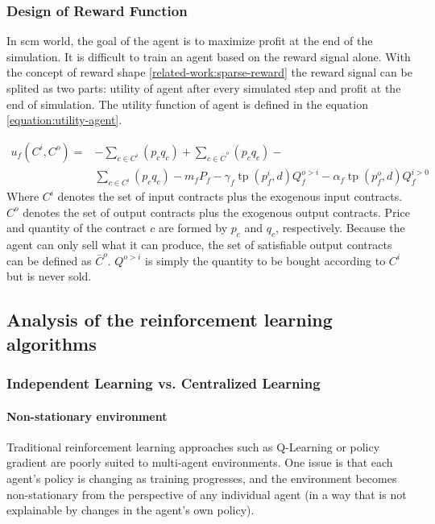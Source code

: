 \subsubsection{Design of Reward Function} 
In \gls{scm} world, the goal of the agent is to maximize profit at the end of the simulation. It is difficult to train an agent based on the reward signal alone. With the concept of reward shape \ref{related-work:sparse-reward} the reward signal can be splited as two parts: utility of agent after every simulated step and profit at the end of simulation. The utility function of agent is defined in the equation \ref{equation:utility-agent}.

\begin{equation} \label{equation:utility-agent}
\begin{aligned}
u_{f}\left(C^{i}, C^{o}\right)=&-\sum_{c \in C^{i}}\left(p_{c} q_{c}\right)+\sum_{c \in \bar{C}^{o}}\left(p_{c} q_{c}\right)-\\
                               &\sum_{c \in C^{i}}\left(p_{c} q_{c}\right)-m_{f} P_{f}-\gamma_{f} \operatorname{tp}\left(p_{f}^{i}, d\right) Q_{f}^{o>i}-\alpha_{f} \operatorname{tp}\left(p_{f}^{o}, d\right) Q_{f}^{i>0}
\end{aligned}
\end{equation}
Where $C^{i}$ denotes the set of input contracts plus the exogenous input contracts. $C^{o}$ denotes the set of output contracts plus the exogenous output contracts. Price and quantity of the contract $c$ are formed by $p_c$ and $q_c$, respectively. Because the agent can only sell what it can produce, the set of satisfiable output contracts can be defined as $\bar{C}^{o}$. $Q^{o>i}$ is simply the quantity to be bought according to $C^{i}$ but is never sold.

\subsection{Analysis of the reinforcement learning algorithms}
\subsubsection{Independent Learning vs. Centralized Learning}
\paragraph{Non-stationary environment}
Traditional reinforcement learning approaches such as Q-Learning or policy gradient
are poorly suited to multi-agent environments. One issue is that each agent’s policy is changing as training progresses, and the environment becomes non-stationary from the perspective of any individual agent (in a way that is not explainable by changes in the agent’s own policy).

